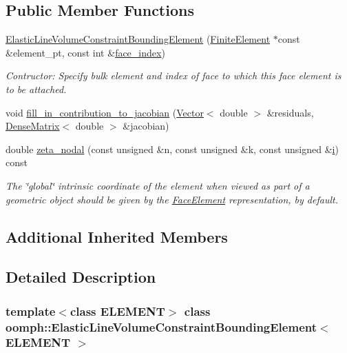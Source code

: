 \subsection*{Public Member Functions}
\begin{DoxyCompactItemize}
\item 
\hyperlink{classoomph_1_1ElasticLineVolumeConstraintBoundingElement_a4759433aaab9f854126480581e4f08d5}{Elastic\+Line\+Volume\+Constraint\+Bounding\+Element} (\hyperlink{classoomph_1_1FiniteElement}{Finite\+Element} $\ast$const \&element\+\_\+pt, const int \&\hyperlink{classoomph_1_1FaceElement_a478d577ac6db67ecc80f1f02ae3ab170}{face\+\_\+index})
\begin{DoxyCompactList}\small\item\em Contructor\+: Specify bulk element and index of face to which this face element is to be attached. \end{DoxyCompactList}\item 
void \hyperlink{classoomph_1_1ElasticLineVolumeConstraintBoundingElement_a6b9670b4a995765e0b2793a3cab05966}{fill\+\_\+in\+\_\+contribution\+\_\+to\+\_\+jacobian} (\hyperlink{classoomph_1_1Vector}{Vector}$<$ double $>$ \&residuals, \hyperlink{classoomph_1_1DenseMatrix}{Dense\+Matrix}$<$ double $>$ \&jacobian)
\item 
double \hyperlink{classoomph_1_1ElasticLineVolumeConstraintBoundingElement_a99fee8b9d2bea757909174f26415139b}{zeta\+\_\+nodal} (const unsigned \&n, const unsigned \&k, const unsigned \&\hyperlink{cfortran_8h_adb50e893b86b3e55e751a42eab3cba82}{i}) const
\begin{DoxyCompactList}\small\item\em The \char`\"{}global\char`\"{} intrinsic coordinate of the element when viewed as part of a geometric object should be given by the \hyperlink{classoomph_1_1FaceElement}{Face\+Element} representation, by default. \end{DoxyCompactList}\end{DoxyCompactItemize}
\subsection*{Additional Inherited Members}


\subsection{Detailed Description}
\subsubsection*{template$<$class E\+L\+E\+M\+E\+NT$>$\newline
class oomph\+::\+Elastic\+Line\+Volume\+Constraint\+Bounding\+Element$<$ E\+L\+E\+M\+E\+N\+T $>$}

